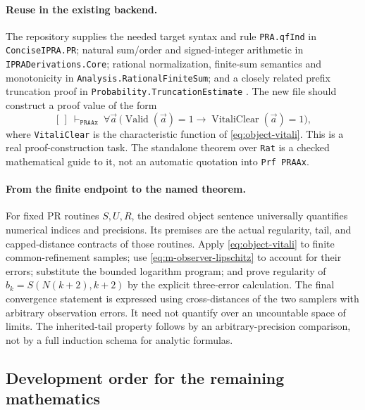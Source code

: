 \paragraph{Reuse in the existing backend.}
The repository supplies the needed target syntax and rule
\texttt{PRA.qfInd} in \texttt{ConciseIPRA.PR}; natural sum/order and
signed-integer arithmetic in \texttt{IPRADerivations.Core}; rational
normalization, finite-sum semantics and monotonicity in
\texttt{Analysis.RationalFiniteSum}; and a closely related prefix
truncation proof in \texttt{Probability.TruncationEstimate}
\cite{repo-pr,repo-rational-sum,repo-truncation}.
The new file should construct a proof value of the form
\[
 [\,]\ \vdash_{\mathtt{PRAAx}}\
 \forall\vec a\,\bigl(\operatorname{Valid}(\vec a)=1
       \longrightarrow\operatorname{VitaliClear}(\vec a)=1\bigr),
\]
where \texttt{VitaliClear} is the characteristic function of
\eqref{eq:object-vitali}. This is a real proof-construction task. The
standalone theorem over \texttt{Rat} is a checked mathematical guide to it,
not an automatic quotation into \texttt{Prf PRAAx}.

\paragraph{From the finite endpoint to the named theorem.}
For fixed PR routines $S,U,R$, the desired object sentence universally
quantifies numerical indices and precisions. Its premises are the actual
regularity, tail, and capped-distance contracts of those routines. Apply
\eqref{eq:object-vitali} to finite common-refinement samples; use
\eqref{eq:m-observer-lipschitz} to account for their errors; substitute the
bounded logarithm program; and prove regularity of
$b_k=S(N(k+2),k+2)$ by the explicit three-error calculation.
The final convergence statement is expressed using cross-distances of
the two samplers with arbitrary observation errors. It need not quantify
over an uncountable space of limits. The inherited-tail property follows
by an arbitrary-precision comparison, not by a full induction schema for
analytic formulas.

\subsection{Development order for the remaining mathematics}

